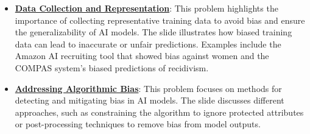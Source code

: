 \documentclass{article}%
\begin{document}
\begin{itemize}[leftmargin=*]
\item \href{https://purdue.brightspace.com/d2l/common/assets/pdfjs-d2l-dist/1.0.14-legacy/web/viewer.html?file=\%2Fcontent\%2Fenforced\%2F1095467-wl.202510.CS.24300.001\%2F16L2-ethics.pdf\%3Fou\%3D1095467\&lang=en-us\&container=d2l-fileviewer-rendered-pdf\&fullscreen=d2l-fileviewer-rendered-pdf-dialog\&height=667#page=22}{\textbf{Data Collection and Representation}}: This problem highlights the importance of collecting representative training data to avoid bias and ensure the generalizability of AI models. The slide illustrates how biased training data can lead to inaccurate or unfair predictions. Examples include the Amazon AI recruiting tool that showed bias against women and the COMPAS system's biased predictions of recidivism.%
\item \href{https://purdue.brightspace.com/d2l/common/assets/pdfjs-d2l-dist/1.0.14-legacy/web/viewer.html?file=\%2Fcontent\%2Fenforced\%2F1095467-wl.202510.CS.24300.001\%2F16L2-ethics.pdf\%3Fou\%3D1095467\&lang=en-us\&container=d2l-fileviewer-rendered-pdf\&fullscreen=d2l-fileviewer-rendered-pdf-dialog\&height=667#page=24}{\textbf{Addressing Algorithmic Bias}}: This problem focuses on methods for detecting and mitigating bias in AI models. The slide discusses different approaches, such as constraining the algorithm to ignore protected attributes or post-processing techniques to remove bias from model outputs.%
\end{itemize}

%
\end{document}
